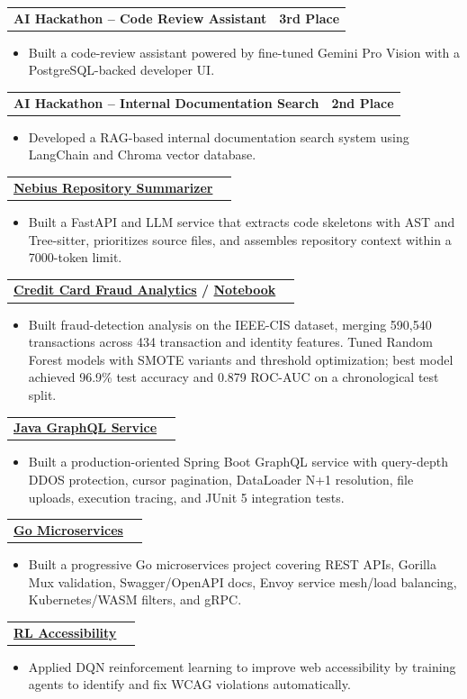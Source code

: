 \documentclass[letterpaper,11pt]{article}
\makeatletter
\newcommand{\resumeItem}[1]{
  \item\small{
    {#1 \vspace{-3pt}}
  }
}
\newcommand{\resumeProjectHeading}[2]{
  \vspace{-3pt}\item
    \begin{tabular*}{1.0\textwidth}[t]{l@{\extracolsep{\fill}}r}
      \textbf{#1} & \textbf{\small #2} \\
    \end{tabular*}\vspace{-7pt}
}
\newcommand{\resumeItemListStart}{\begin{itemize}}
\newcommand{\resumeItemListEnd}{\end{itemize}\vspace{0pt}}
\makeatother
\begin{document}
  \resumeProjectHeading
    {AI Hackathon -- Code Review Assistant}{3rd Place}
  \resumeItemListStart
    \resumeItem{Built a code-review assistant powered by fine-tuned Gemini Pro Vision with a PostgreSQL-backed developer UI.}
  \resumeItemListEnd

  \resumeProjectHeading
    {AI Hackathon -- Internal Documentation Search}{2nd Place}
  \resumeItemListStart
    \resumeItem{Developed a RAG-based internal documentation search system using LangChain and Chroma vector database.}
  \resumeItemListEnd

  \resumeProjectHeading
    {\href{https://github.com/aymanapatel/nebius-project}{Nebius Repository Summarizer}}{}
  \resumeItemListStart
    \resumeItem{Built a FastAPI and LLM service that extracts code skeletons with AST and Tree-sitter, prioritizes source files, and assembles repository context within a 7000-token limit.}
  \resumeItemListEnd

  \resumeProjectHeading
    {\href{https://github.com/aymanpatel/qmul-all-projects/blob/main/data-analytics/coursework1/credit-card-report.pdf}{Credit Card Fraud Analytics} / \href{https://github.com/aymanpatel/qmul-all-projects/blob/main/data-analytics/coursework1/credit-card-notebook.ipynb}{Notebook}}{}
  \resumeItemListStart
    \resumeItem{Built fraud-detection analysis on the IEEE-CIS dataset, merging 590,540 transactions across 434 transaction and identity features. Tuned Random Forest models with SMOTE variants and threshold optimization; best model achieved 96.9\% test accuracy and 0.879 ROC-AUC on a chronological test split.}
  \resumeItemListEnd

  \resumeProjectHeading
    {\href{https://github.com/aymanapatel/graphql-app}{Java GraphQL Service}}{}
  \resumeItemListStart
    \resumeItem{Built a production-oriented Spring Boot GraphQL service with query-depth DDOS protection, cursor pagination, DataLoader N+1 resolution, file uploads, execution tracing, and JUnit 5 integration tests.}
  \resumeItemListEnd

  \resumeProjectHeading
    {\href{https://github.com/aymanapatel/golang-microservices}{Go Microservices}}{}
  \resumeItemListStart
    \resumeItem{Built a progressive Go microservices project covering REST APIs, Gorilla Mux validation, Swagger/OpenAPI docs, Envoy service mesh/load balancing, Kubernetes/WASM filters, and gRPC.}
  \resumeItemListEnd

  \resumeProjectHeading
    {\href{https://github.com/aymanapatel/rl-a11y}{RL Accessibility}}{}
  \resumeItemListStart
    \resumeItem{Applied DQN reinforcement learning to improve web accessibility by training agents to identify and fix WCAG violations automatically.}
  \resumeItemListEnd
\end{document}

